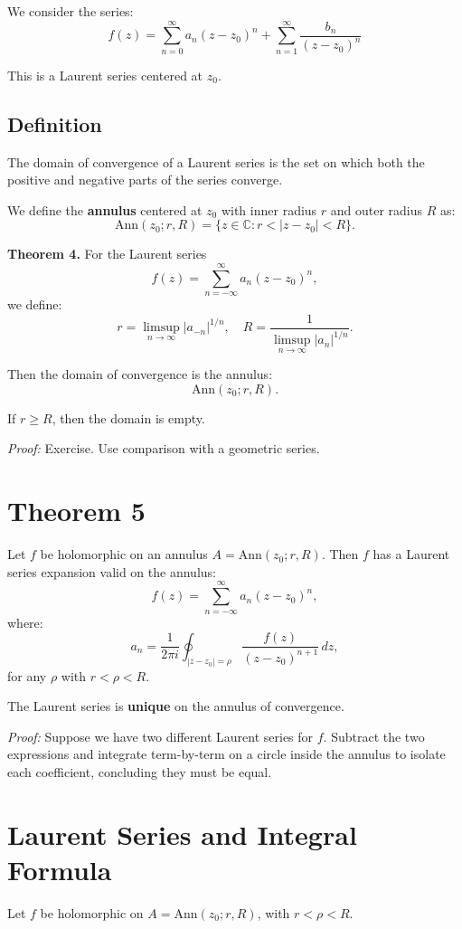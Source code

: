 \documentclass[12pt]{article}
\theoremstyle{definition} %
\theoremstyle{plain} %
\begin{document}
We consider the series:
\[
f(z) = \sum_{n=0}^\infty a_n (z - z_0)^n + \sum_{n=1}^\infty \frac{b_n}{(z - z_0)^n}
\]

This is a Laurent series centered at $z_0$.

\subsection*{Definition}

The domain of convergence of a Laurent series is the set on which both the positive and negative parts of the series converge.

We define the \textbf{annulus} centered at $z_0$ with inner radius $r$ and outer radius $R$ as:
\[
\text{Ann}(z_0; r, R) = \{ z \in \mathbb{C} : r < |z - z_0| < R \}.
\]

\textbf{Theorem 4.} For the Laurent series
\[
f(z) = \sum_{n=-\infty}^{\infty} a_n (z - z_0)^n,
\]
we define:
\[
r = \limsup_{n \to \infty} |a_{-n}|^{1/n}, \quad R = \frac{1}{\limsup_{n \to \infty} |a_n|^{1/n}}.
\]

Then the domain of convergence is the annulus:
\[
\text{Ann}(z_0; r, R).
\]

If $r \geq R$, then the domain is empty.

\textit{Proof:} Exercise. Use comparison with a geometric series.

\section*{Theorem 5}

Let $f$ be holomorphic on an annulus $A = \text{Ann}(z_0; r, R)$. Then $f$ has a Laurent series expansion valid on the annulus:
\[
f(z) = \sum_{n=-\infty}^\infty a_n (z - z_0)^n,
\]
where:
\[
a_n = \frac{1}{2\pi i} \oint_{|z - z_0| = \rho} \frac{f(z)}{(z - z_0)^{n+1}}\,dz,
\]
for any $\rho$ with $r < \rho < R$.

The Laurent series is \textbf{unique} on the annulus of convergence.

\textit{Proof:} Suppose we have two different Laurent series for $f$. Subtract the two expressions and integrate term-by-term on a circle inside the annulus to isolate each coefficient, concluding they must be equal.
\section*{Laurent Series and Integral Formula}

Let $f$ be holomorphic on $A = \text{Ann}(z_0; r, R)$, with $r < \rho < R$.
\end{document}
